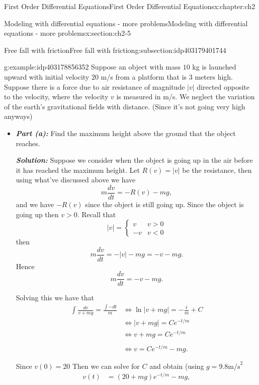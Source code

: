 \documentclass[oneside,10pt,]{book}
\newcommand{\alert}[1]{\textbf{\textit{#1}}}
\numberwithin{equation}{section}
\numberwithin{equation}{section}
\newcommand{\lt}{<}
\newcommand{\amp}{&}
\begin{document}
\begin{chapterptx}{First Order Differential Equations}{}{First Order Differential Equations}{}{}{x:chapter:ch2}
\begin{sectionptx}{Modeling with differential equations - more problems}{}{Modeling with differential equations - more problems}{}{}{x:section:ch2-5}
\begin{subsectionptx}{Free fall with friction}{}{Free fall with friction}{}{}{g:subsection:idp403179401744}
\begin{itemize}[label=\textbullet]
\end{itemize}
\begin{example}{}{g:example:idp403178856352}%
Suppose an object with mass \(10\) kg is launched upward with initial velocity \(20\) m\slash{}s from a platform that is \(3\) meters high. Suppose there is a force due to air resistance of magnitude \(\left|v\right|\) directed opposite to the velocity, where the velocity \(v\) is measured in m\slash{}s. We neglect the variation of the earth's gravitational fields with distance. (Since it's not going very high anyways)%
%
\begin{itemize}[label=\textbullet]
\item{}\alert{Part (a):} Find the maximum height above the ground that the object reaches.%
\par
\alert{Solution:} Suppose we consider when the object is going up in the air before it has reached the maximum height. Let \(R(v)=\left|v\right|\) be the resistance, then using what've discussed above we have%
\begin{equation*}
m\frac{dv}{dt}=-R(v)-mg,
\end{equation*}
and we have \(-R(v)\) since the object is still going up. Since the object is going up then \(v>0\). Recall that%
\begin{equation*}
\left|v\right|=\begin{cases}
v \amp v>0\\
-v \amp v\lt0
\end{cases}
\end{equation*}
then%
\begin{equation*}
m\frac{dv}{dt}=-\left|v\right|-mg=-v-mg.
\end{equation*}
Hence%
\begin{equation*}
m\frac{dv}{dt}=-v-mg.
\end{equation*}
%
\par
Solving this we have that%
\begin{align*}
\int\frac{dv}{v+mg}=\frac{\int-dt}{m} \amp \iff\ln\left|v+mg\right|=-\frac{t}{m}+C\\
\amp \iff\left|v+mg\right|=Ce^{-t/m}\\
\amp \iff v+mg=Ce^{-t/m}\\\\
\amp \iff v=Ce^{-t/m}-mg.
\end{align*}
%
\par
Since \(v(0)=20\) Then we can solve for \(C\) and obtain (using \(g=9.8 \text{m/s}^2\)%
\begin{align*}
v(t) \amp =\left(20+mg\right)e^{-t/m}-mg,\\

\end{align*}
\end{itemize}
\end{example}
\end{subsectionptx}
\end{sectionptx}
\end{chapterptx}
\end{document}

